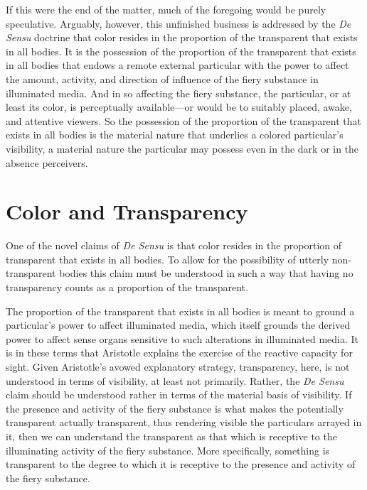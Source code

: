 If this were the end of the matter, much of the foregoing would be purely speculative. Arguably, however, this unfinished business is addressed by the \emph{De Sensu} doctrine that color resides in the proportion of the transparent that exists in all bodies. It is the possession of the proportion of the transparent that exists in all bodies that endows a remote external particular with the power to affect the amount, activity, and direction of influence of the fiery substance in illuminated media. And in so affecting the fiery substance, the particular, or at least its color, is perceptually available---or would be to suitably placed, awake, and attentive viewers. So the possession of the proportion of the transparent that exists in all bodies is the material nature that underlies a colored particular's visibility, a material nature the particular may possess even in the dark or in the absence perceivers.


\section{Color and Transparency} %
\label{sec:color_and_transparency}

One of the novel claims of \emph{De Sensu} is that color resides in the proportion of transparent that exists in all bodies. To allow for the possibility of utterly non-transparent bodies this claim must be understood in such a way that having no transparency counts as a proportion of the transparent. 

The proportion of the transparent that exists in all bodies is meant to ground a particular's power to affect illuminated media, which itself grounds the derived power to affect sense organs sensitive to such alterations in illuminated media. It is in these terms that Aristotle explains the exercise of the reactive capacity for sight. Given Aristotle's avowed explanatory strategy, transparency, here, is not understood in terms of visibility, at least not primarily. Rather, the \emph{De Sensu} claim should be understood rather in terms of the material basis of visibility. If the presence and activity of the fiery substance is what makes the potentially transparent actually transparent, thus rendering visible the particulars arrayed in it, then we can understand the transparent as that which is receptive to the illuminating activity of the fiery substance. More specifically, something is transparent to the degree to which it is receptive to the presence and activity of the fiery substance. 

